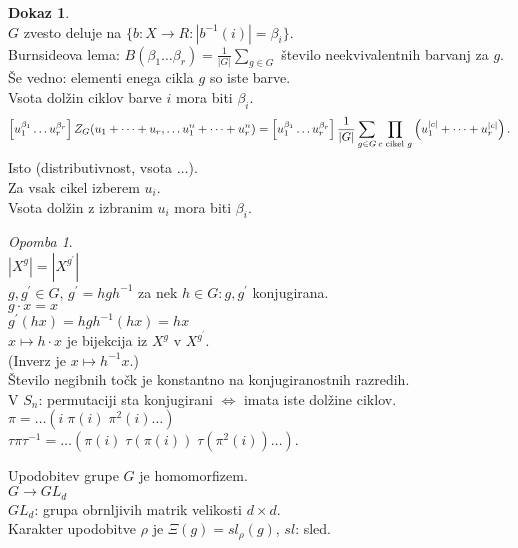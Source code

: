 \documentclass[a4paper, 12pt]{book}
\theoremstyle{definition}
\newtheorem{pro}[counter]{Dokaz}
\theoremstyle{remark}
\newtheorem*{rem}{Opomba}
\begin{document}
\begin{pro} \text{} \\
  $G$ zvesto deluje na $\{b: X \to R: \left|b^{-1}(i)\right| = \beta_i\}$. \\
  Burnsideova lema: $B(\beta_1 \dots \beta_r) = \frac{1}{|G|} \sum_{g \in G}$ število neekvivalentnih barvanj za $g$. \\
  Še vedno: elementi enega cikla $g$ so iste barve. \\
  Vsota dolžin ciklov barve $i$ mora biti $\beta_i$.
  \begin{equation*}
    \left[u_1^{\beta_1} \dots u_r^{\beta_r}\right] Z_G(u_1 + \dots + u_r, \dots u_1^n + \dots + u_r^n) \\
    = \left[u_1^{\beta_1} \dots u_r^{\beta_r}\right] \frac{1}{|G|} \sum_{g \in G} \prod_{c \text{ cikel } g}
      \left(u_1^{|c|} + \dots + u_r^{|c|}\right).
  \end{equation*}
  Isto (distributivnost, vsota $\dots$). \\
  Za vsak cikel izberem $u_i$. \\
  Vsota dolžin z izbranim $u_i$ mora biti $\beta_i$.
\end{pro}
\begin{rem} \text{} \\
  $\left|X^g\right| = \left|X^{g^{'}}\right|$ \\
  $g, g^{'} \in G$, $g^{'} = h g h^{-1}$ za nek $h \in G: g, g^{'}$ konjugirana. \\
  $g \cdot x = x$ \\
  $g^{'} (h x) = h g h^{-1} (h x) = h x$ \\
  $x \mapsto h \cdot x$ je bijekcija iz $X^g$ v $X^{g^{'}}$. \\
  (Inverz je $x \mapsto h^{-1} x$.) \\
  Število negibnih točk je konstantno na konjugiranostnih razredih. \\
  V $S_n$: permutaciji sta konjugirani $\iff$ imata iste dolžine ciklov. \\
  $\pi = \dots (i \; \pi(i) \; \pi^2(i) \dots)$ \\
  $\tau \pi \tau^{-1} = \dots (\pi(i) \; \tau(\pi(i)) \; \tau\left(\pi^2(i)\right) \dots)$.
\end{rem}
Upodobitev grupe $G$ je homomorfizem. \\
$G \to GL_d$ \\
$GL_d$: grupa obrnljivih matrik velikosti $d \times d$. \\
Karakter upodobitve $\rho$ je $\Xi(g) = sl_{\rho}(g)$, $sl$: sled. \\
\end{document}
